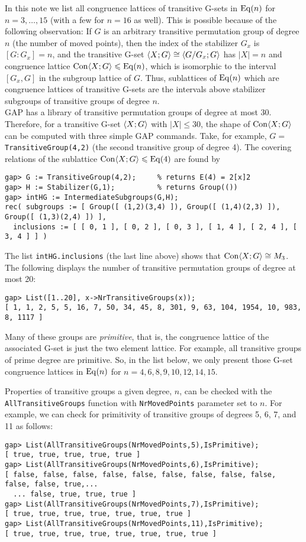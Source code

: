In this note we list all congruence lattices of transitive G-sets in $\operatorname{Eq}(n)$
for $n=3,\dots, 15$ (with a few for $n=16$ as well).  This is possible because
of the following observation: If $G$ is an arbitrary transitive permutation
group of degree $n$ (the number of moved points), then the index of the
stabilizer $G_x$ is $[G: G_x] = n$, and the transitive G-set $\langle X; G\rangle \cong 
\langle G/G_x; G\rangle$ has $|X|=n$ and congruence lattice $\operatorname{Con}\langle X; G\rangle \leqslant \operatorname{Eq}(n)$,
which is isomorphic to the interval $[G_x, G]$ in the subgroup lattice of $G$.  
Thus, sublattices of $\operatorname{Eq}(n)$ which are congruence lattices of transitive G-sets
are the intervals above stabilizer subgroups of transitive groups of degree $n$.
\\[8pt]
GAP has a library of transitive permutation groups of degree at most 30.
Therefore, for a transitive G-set $\langle X; G\rangle$ with $|X|\leq 30$, the shape of $\operatorname{Con}\langle X;
G\rangle$ can be computed with three simple GAP commands.  Take, for example,
$G=$ {\tt TransitiveGroup(4,2)} (the second transitive group of
degree 4).  The covering relations of the sublattice $\operatorname{Con}\langle X; G\rangle \leqslant \operatorname{Eq}(4)$
are found by
{\small
\begin{verbatim}
gap> G := TransitiveGroup(4,2);     % returns E(4) = 2[x]2
gap> H := Stabilizer(G,1);          % returns Group(())
gap> intHG := IntermediateSubgroups(G,H);
rec( subgroups := [ Group([ (1,2)(3,4) ]), Group([ (1,4)(2,3) ]), Group([ (1,3)(2,4) ]) ], 
  inclusions := [ [ 0, 1 ], [ 0, 2 ], [ 0, 3 ], [ 1, 4 ], [ 2, 4 ], [ 3, 4 ] ] )
\end{verbatim}}
\noindent The list {\tt intHG.inclusions} (the last line above) shows that $\operatorname{Con}\langle X; G\rangle \cong M_3$.
\\[6pt]
The following displays the number of transitive permutation groups of degree at
most 20: 
{\small
\begin{verbatim}
gap> List([1..20], x->NrTransitiveGroups(x));
[ 1, 1, 2, 5, 5, 16, 7, 50, 34, 45, 8, 301, 9, 63, 104, 1954, 10, 983, 8, 1117 ]
\end{verbatim}}
\noindent Many of these groups are \emph{primitive}, that is, the congruence
lattice of the associated G-set is just the two element lattice.  For example,
all transitive groups of prime degree are primitive.  So, in the list below, we
only present those G-set congruence lattices in $\operatorname{Eq}(n)$ for $n=4, 6, 8, 9,
10, 12, 14, 15$. 

Properties of transitive groups a given degree, $n$, can be checked with
the {\tt AllTransitiveGroups} function with {\tt NrMovedPoints} parameter set to
$n$.  For example, we can check for primitivity of transitive groups of degrees
5, 6, 7, and 11 as follows:
{\small
\begin{verbatim}
gap> List(AllTransitiveGroups(NrMovedPoints,5),IsPrimitive);
[ true, true, true, true, true ]
gap> List(AllTransitiveGroups(NrMovedPoints,6),IsPrimitive);
[ false, false, false, false, false, false, false, false, false, false, false, true,...
  ... false, true, true, true ]
gap> List(AllTransitiveGroups(NrMovedPoints,7),IsPrimitive);
[ true, true, true, true, true, true, true ]
gap> List(AllTransitiveGroups(NrMovedPoints,11),IsPrimitive);
[ true, true, true, true, true, true, true, true ]
\end{verbatim}}

